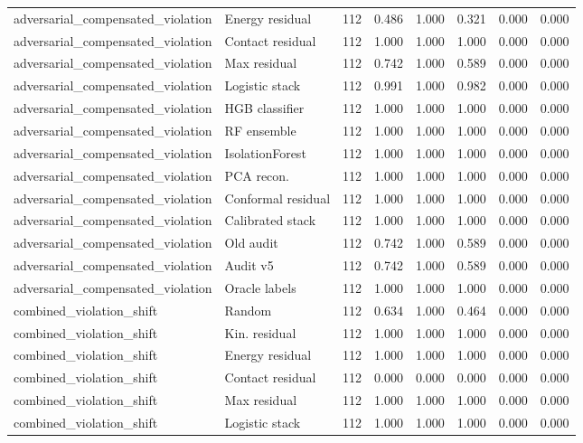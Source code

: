{\begin{longtable}{llrrrrrr}
adversarial\_compensated\_violation & Energy residual & 112 & 0.486 & 1.000 & 0.321 & 0.000 & 0.000 \\
adversarial\_compensated\_violation & Contact residual & 112 & 1.000 & 1.000 & 1.000 & 0.000 & 0.000 \\
adversarial\_compensated\_violation & Max residual & 112 & 0.742 & 1.000 & 0.589 & 0.000 & 0.000 \\
adversarial\_compensated\_violation & Logistic stack & 112 & 0.991 & 1.000 & 0.982 & 0.000 & 0.000 \\
adversarial\_compensated\_violation & HGB classifier & 112 & 1.000 & 1.000 & 1.000 & 0.000 & 0.000 \\
adversarial\_compensated\_violation & RF ensemble & 112 & 1.000 & 1.000 & 1.000 & 0.000 & 0.000 \\
adversarial\_compensated\_violation & IsolationForest & 112 & 1.000 & 1.000 & 1.000 & 0.000 & 0.000 \\
adversarial\_compensated\_violation & PCA recon. & 112 & 1.000 & 1.000 & 1.000 & 0.000 & 0.000 \\
adversarial\_compensated\_violation & Conformal residual & 112 & 1.000 & 1.000 & 1.000 & 0.000 & 0.000 \\
adversarial\_compensated\_violation & Calibrated stack & 112 & 1.000 & 1.000 & 1.000 & 0.000 & 0.000 \\
adversarial\_compensated\_violation & Old audit & 112 & 0.742 & 1.000 & 0.589 & 0.000 & 0.000 \\
adversarial\_compensated\_violation & Audit v5 & 112 & 0.742 & 1.000 & 0.589 & 0.000 & 0.000 \\
adversarial\_compensated\_violation & Oracle labels & 112 & 1.000 & 1.000 & 1.000 & 0.000 & 0.000 \\
combined\_violation\_shift & Random & 112 & 0.634 & 1.000 & 0.464 & 0.000 & 0.000 \\
combined\_violation\_shift & Kin. residual & 112 & 1.000 & 1.000 & 1.000 & 0.000 & 0.000 \\
combined\_violation\_shift & Energy residual & 112 & 1.000 & 1.000 & 1.000 & 0.000 & 0.000 \\
combined\_violation\_shift & Contact residual & 112 & 0.000 & 0.000 & 0.000 & 0.000 & 0.000 \\
combined\_violation\_shift & Max residual & 112 & 1.000 & 1.000 & 1.000 & 0.000 & 0.000 \\
combined\_violation\_shift & Logistic stack & 112 & 1.000 & 1.000 & 1.000 & 0.000 & 0.000 \\

\end{longtable}}
